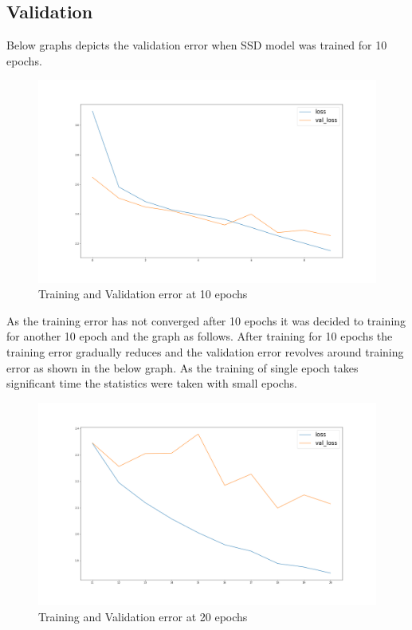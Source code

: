 \subsection{Validation}
Below graphs depicts the validation error when SSD model was trained for 10 epochs.
\begin{figure}[H]
\includegraphics[scale=0.4]{conf0_loss-val_loss_0_10epochs}
\begin{center}
\caption{Training and Validation error at 10 epochs}
\end{center}
\end{figure}
As the training error has not converged after 10 epochs it was decided to training for another 10 epoch and the graph as follows. After training for 10 epochs the training error gradually reduces and the validation error revolves around training error as shown in the below graph. As the training of single epoch takes significant time the statistics were taken with small epochs.

\begin{figure}[H]
\includegraphics[scale=0.4]{conf0_loss-val_loss_10_20epochs}
\begin{center}
\caption{Training and Validation error at 20 epochs}
\end{center}
\end{figure}

